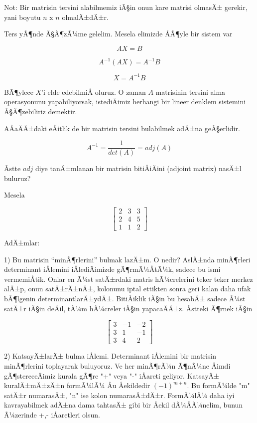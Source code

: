 \documentclass[12pt,fleqn]{article}\usepackage{../../common}
\begin{document}
Not: Bir matrisin tersini alabilmemiz iÃ§in onun kare matrisi olmasÄ± 
gerekir,
yani boyutu $n$ x $n$ olmalÄ±dÄ±r. 

Ters yÃ¶nde Ã§Ã¶zÃ¼me gelelim. Mesela elimizde ÅÃ¶yle bir sistem 
var

$$  AX = B$$

$$  A^{-1}(AX) = A^{-1}B$$

$$  X = A^{-1}B$$

BÃ¶ylece $X$'i elde edebilmiÅ oluruz. O zaman $A$ matrisinin tersini alma
operasyonunu yapabiliyorsak, istediÄimiz herhangi bir lineer denklem
sistemini Ã§Ã¶zebiliriz demektir. 

AÅaÄÄ±daki eÅitlik de bir matrisin tersini bulabilmek adÄ±na 
geÃ§erlidir. 

$$ A^{-1} = \frac{1}{det(A)}  = adj(A)$$

Ãstte $adj$ diye tanÄ±mlanan bir matrisin bitiÅiÄini (adjoint matrix) 
nasÄ±l
buluruz?

Mesela

$$ 
\left[\begin{array}{rrr}
2 & 3 & 3 \\
2 & 4 & 5 \\
1 & 1 & 2
\end{array}\right]
 $$

AdÄ±mlar:

1) Bu matrisin ``minÃ¶rlerini'' bulmak lazÄ±m. O nedir? AslÄ±nda 
minÃ¶rleri
determinant iÅlemini iÅlediÄimizde gÃ¶rmÃ¼ÅtÃ¼k, sadece bu 
ismi vermemiÅtik.
Onlar en Ã¼st satÄ±rdaki matris hÃ¼crelerini teker teker merkez alÄ±p, 
onun
satÄ±rÄ±nÄ±, kolonunu iptal ettikten sonra geri kalan daha ufak 
bÃ¶lgenin
determinantlarÄ±ydÄ±. BitiÅiklik iÃ§in bu hesabÄ± sadece Ã¼st 
satÄ±r iÃ§in deÄil,
tÃ¼m hÃ¼creler iÃ§in yapacaÄÄ±z. Ãstteki Ã¶rnek iÃ§in

$$ 
\left[\begin{array}{rrr}
3 & -1 & -2 \\
3 & 1 & -1 \\
3 & 4 & 2
\end{array}\right]
 $$




2) KatsayÄ±larÄ± bulma iÅlemi. Determinant iÅlemini bir matrisin 
minÃ¶rlerini 
toplayarak buluyoruz. Ve her minÃ¶rÃ¼n Ã¶nÃ¼ne Åimdi 
gÃ¶stereceÄimiz kurala gÃ¶re "+" 
veya "-" iÅareti geliyor. KatsayÄ± kuralÄ±mÄ±zÄ±n formÃ¼lÃ¼ Åu 
Åekildedir 
$(-1)^{m+n}$. Bu formÃ¼lde "m" satÄ±r numarasÄ±, "n" ise kolon 
numarasÄ±dÄ±r. FormÃ¼lÃ¼ 
daha iyi kavrayabilmek adÄ±na dama tahtasÄ± gibi bir Åekil 
dÃ¼ÅÃ¼nelim, bunun
Ã¼zerinde +,- iÅaretleri olsun. 
\end{document}
